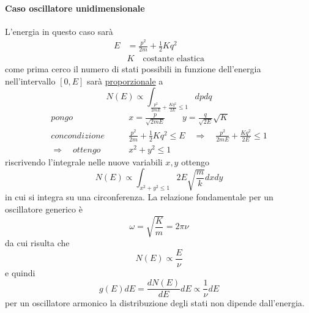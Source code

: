 \paragraph{Caso oscillatore unidimensionale}
L'energia in questo caso sarà
\begin{equation}
\begin{split}
E & = \frac{p^2}{2m} + \frac{1}{2} K q^2 \\
& K \quad \mbox{costante elastica}
\end{split}
\end{equation}
come prima cerco il numero di stati possibili in funzione dell'energia nell'intervallo $[0, E]$ sarà \underline{proporzionale} a
\begin{equation}
N(E) \propto \int_{\frac{p^2}{2m E} + \frac{K q^2}{2E} \le 1 } dp dq
\end{equation}
\begin{equation}
\begin{split}
pongo &\quad\quad x = \frac{p}{\sqrt{2m E}} \quad\quad y = \frac{q}{\sqrt{2E}} \sqrt{K}  \\
con condizione &\quad\quad  \frac{p^2}{2m} + \frac{1}{2} K q^2  \le E 
\quad\Rightarrow\quad \frac{p^2}{2mE} + \frac{K q^2}{2E}   \le 1 \\
\Rightarrow\quad ottengo &\quad\quad x^2 + y^2 \le 1
\end{split}
\end{equation}
riscrivendo l'integrale nelle nuove variabili $x, y$ ottengo
\begin{equation}
N(E) \propto \int_{x^2 + y^2 \le 1} 2E\sqrt{\frac{m}{k}} dx dy
\end{equation}
in cui si integra su una circonferenza.
La relazione fondamentale per un oscillatore generico è
\begin{equation}
\omega = \sqrt{\frac{K}{m}} = 2\pi \nu
\end{equation}
da cui risulta che
\begin{equation}
N(E) \propto \frac{E}{\nu}
\end{equation}
e quindi
\begin{equation}
g(E)dE = \frac{dN(E)}{dE} dE \propto \frac{1}{\nu} dE
\label{gE_costante}
\end{equation}
per un oscillatore armonico la distribuzione degli stati non dipende dall'energia.

